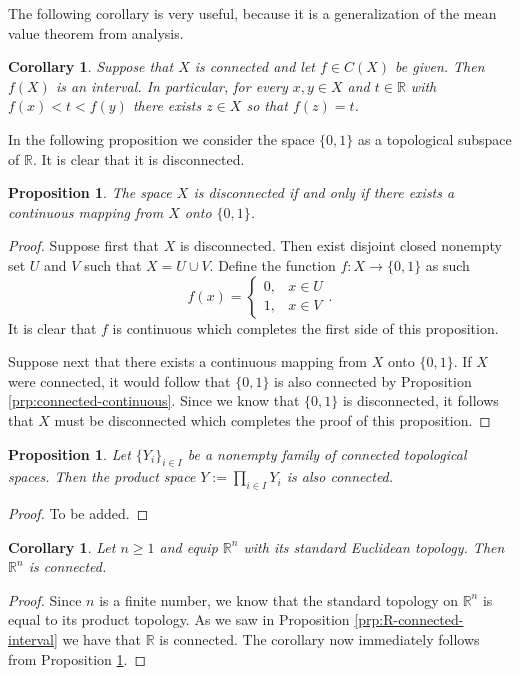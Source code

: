 \documentclass[11pt,a4paper]{article}
\theoremstyle{definition}
\theoremstyle{plain}
\newtheorem{proposition}[theorem]{Proposition}
\newtheorem{corollary}[theorem]{Corollary}
\newcommand{\R}{\mathbb{R}}
\begin{document}
  The following corollary is very useful, because it is a generalization
  of the mean value theorem from analysis.

  \begin{corollary}
    Suppose that $X$ is connected and let $f \in C(X)$ be given.
    Then $f(X)$ is an interval. In particular, for every $x, y \in X$ and 
    $t \in \R$ with $f(x) < t < f(y)$ there exists $z \in X$ so that $f(z) = t$.
  \end{corollary}

  In the following proposition we consider the space $\{0, 1\}$ as a topological
  subspace of $\R$. It is clear that it is disconnected.

  \begin{proposition}
    The space $X$ is disconnected if and only if there exists a continuous 
    mapping from $X$ onto $\{0, 1\}$.
  \end{proposition}
  \begin{proof}
    Suppose first that $X$ is disconnected.
    Then exist disjoint closed nonempty set $U$ and $V$ such that
    $X = U \cup V$.
    Define the function $f \colon X \to \{0, 1\}$ as such
    \[
      f(x) =
      \begin{cases}
        0, &x \in U \\
        1, &x \in V
      \end{cases}.
    \]
    It is clear that $f$ is continuous which completes the first side
    of this proposition.

    Suppose next that there exists a continuous mapping from $X$ onto 
    $\{0, 1\}$.
    If $X$ were connected, it would follow that $\{0,1\}$ is also connected
    by Proposition \ref{prp:connected-continuous}.
    Since we know that $\{0,1\}$ is disconnected, it follows that $X$
    must be disconnected which completes the proof of this proposition.
  \end{proof}

  \begin{proposition}\label{prp:product-connected}
    Let $\{Y_i\}_{i \in I}$ be a nonempty family of connected topological 
    spaces. Then the product space $Y := \prod_{i \in I} Y_i$ is also connected.
  \end{proposition}
  \begin{proof}
    To be added.
  \end{proof}

  \begin{corollary}
    Let $n \geq 1$ and equip $\R^n$ with its standard Euclidean topology.
    Then $\R^n$ is connected.
  \end{corollary}
  \begin{proof}
    Since $n$ is a finite number, we know that the standard topology on
    $\R^n$ is equal to its product topology.
    As we saw in Proposition \ref{prp:R-connected-interval} we have that
    $\R$ is connected.
    The corollary now immediately follows from Proposition 
    \ref{prp:product-connected}.
  \end{proof}
\end{document}
